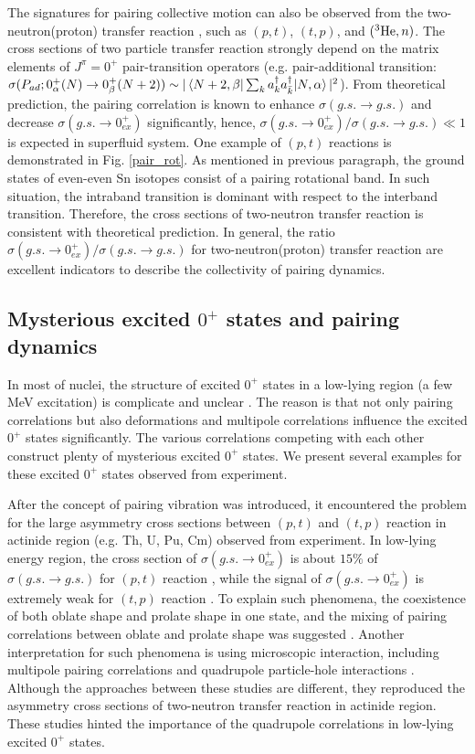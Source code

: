 \documentclass[11pt]{book} %
\begin{document}
The signatures for pairing collective motion can also be observed from the two-neutron(proton) transfer reaction \cite{BHR73}, such as $(p, t)$, $(t, p)$, and $({}^3{\rm He}, n)$. The cross sections of two particle transfer reaction strongly depend on the matrix elements of $J^{\pi}=0^+$ pair-transition operators (e.g. pair-additional transition: $\sigma( P_{ad};0_{\alpha}^+(N) \to 0_{\beta}^+(N+2))\sim |\braket{N+2,\beta|\sum_k a^{\dag}_k a^{\dag}_{\bar{k}}|N,\alpha}|^2$). From theoretical prediction, the pairing correlation is known to enhance $\sigma(g.s.\to g.s.)$ and decrease $\sigma(g.s.\to 0_{ex}^+)$ significantly, hence, $\sigma(g.s.\to 0_{ex}^+)/\sigma(g.s.\to g.s.)\ll 1$ is expected in superfluid system. One example of $(p, t)$ reactions is demonstrated in Fig. \ref{pair_rot}. As mentioned in previous paragraph, the ground states of even-even Sn isotopes consist of a pairing rotational band. In such situation, the intraband transition is dominant with respect to the interband transition. Therefore, the cross sections of two-neutron transfer reaction is consistent with theoretical prediction. In general, the ratio $\sigma(g.s.\to 0_{ex}^+)/\sigma(g.s.\to g.s.)$ for two-neutron(proton) transfer reaction are excellent indicators to describe the collectivity of pairing dynamics.

\subsection{Mysterious excited $0^+$ states and pairing dynamics}
In most of nuclei, the structure of excited $0^+$ states in a low-lying region (a few MeV excitation) is complicate and unclear \cite{HW11}. The reason is that not only pairing correlations but also deformations and multipole correlations influence the excited $0^+$ states significantly. The various correlations competing with each other construct plenty of mysterious excited $0^+$ states. We present several examples for these excited $0^+$ states observed from experiment.

After the concept of pairing vibration was introduced, it encountered the problem for the large asymmetry cross sections between $(p, t)$ and $(t, p)$ reaction in actinide region (e.g. Th, U, Pu, Cm) observed from experiment. In low-lying energy region, the cross section of $\sigma(g.s.\to 0_{ex}^+)$ is about $15\%$ of $\sigma(g.s.\to g.s.)$ for $(p, t)$ reaction \cite{MEFSS70, MEFSS72}, while the signal of $\sigma(g.s.\to 0_{ex}^+)$ is extremely weak for $(t, p)$ reaction \cite{Cas72}. To explain such phenomena, the coexistence of both oblate shape and prolate shape in one state, and the mixing of pairing correlations between oblate and prolate shape was suggested \cite{GJV71,RK72}. Another interpretation for such phenomena is using microscopic interaction, including multipole pairing correlations and quadrupole particle-hole interactions \cite{RB76}. Although the approaches between these studies are different, they reproduced the asymmetry cross sections of two-neutron transfer reaction in actinide region. These studies hinted the importance of the quadrupole correlations in low-lying excited $0^+$ states. 
\end{document}
